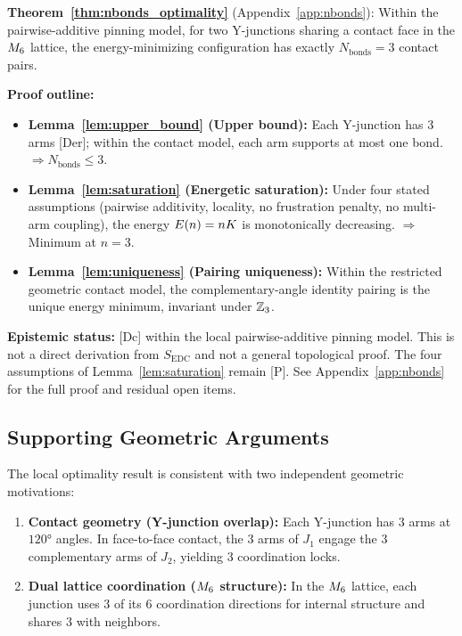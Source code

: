 \begin{derivationbox}[title=Local Optimality of $N_{\text{bonds}} = 3$ (Summary)]
    \textbf{Theorem~\ref{thm:nbonds_optimality}}
    (Appendix~\ref{app:nbonds}):
    Within the pairwise-additive pinning model, for two Y-junctions
    sharing a contact face in the $M_6$ lattice, the energy-minimizing
    configuration has exactly $N_{\text{bonds}} = 3$ contact pairs.

    \medskip
    \textbf{Proof outline:}
    \begin{itemize}
        \item \textbf{Lemma~\ref{lem:upper_bound} (Upper bound):}
              Each Y-junction has 3 arms [Der]; within the contact model,
              each arm supports at most one bond.
              $\Rightarrow N_{\text{bonds}} \leq 3$.
        \item \textbf{Lemma~\ref{lem:saturation} (Energetic saturation):}
              Under four stated assumptions (pairwise additivity, locality,
              no frustration penalty, no multi-arm coupling), the energy
              $E(n) = nK$ is monotonically decreasing.
              $\Rightarrow$ Minimum at $n = 3$.
        \item \textbf{Lemma~\ref{lem:uniqueness} (Pairing uniqueness):}
              Within the restricted geometric contact model, the
              complementary-angle identity pairing is the unique
              energy minimum, invariant under $\mathbb{Z}_3$.
    \end{itemize}

    \textbf{Epistemic status:}
    [Dc] within the local pairwise-additive pinning model.
    This is not a direct derivation from $S_{\text{EDC}}$ and not a
    general topological proof. The four assumptions of
    Lemma~\ref{lem:saturation} remain [P].
    See Appendix~\ref{app:nbonds} for the full proof and residual
    open items.
\end{derivationbox}

\subsection{Supporting Geometric Arguments}

The local optimality result is consistent with two independent
geometric motivations:

\begin{enumerate}
    \item \textbf{Contact geometry (Y-junction overlap):}
          Each Y-junction has 3 arms at $120°$ angles. In face-to-face
          contact, the 3 arms of $J_1$ engage the 3 complementary arms
          of $J_2$, yielding 3 coordination locks.

    \item \textbf{Dual lattice coordination ($M_6$ structure):}
          In the $M_6$ lattice, each junction uses 3 of its 6
          coordination directions for internal structure and shares
          3 with neighbors.
\end{enumerate}

